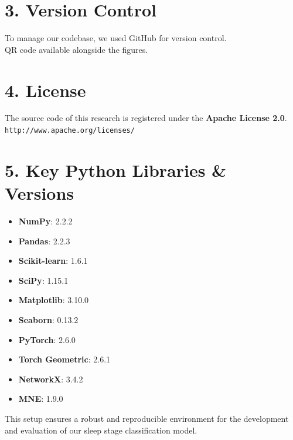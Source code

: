 \section{3. Version Control}
To manage our codebase, we used GitHub for version control.\\
QR code available alongside the figures.

\section{4. License}
The source code of this research is registered under the \textbf{Apache License 2.0}.\\
\texttt{http://www.apache.org/licenses/}

\section{5. Key Python Libraries \& Versions}
\begin{itemize}
	\item \textbf{NumPy}: 2.2.2
	\item \textbf{Pandas}: 2.2.3
	\item \textbf{Scikit-learn}: 1.6.1
	\item \textbf{SciPy}: 1.15.1
	\item \textbf{Matplotlib}: 3.10.0
	\item \textbf{Seaborn}: 0.13.2
	\item \textbf{PyTorch}: 2.6.0
	\item \textbf{Torch Geometric}: 2.6.1
	\item \textbf{NetworkX}: 3.4.2
	\item \textbf{MNE}: 1.9.0
\end{itemize}
This setup ensures a robust and reproducible environment for the development and evaluation of our sleep stage classification model.
